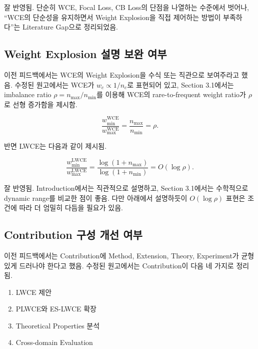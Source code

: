 \documentclass[11pt,a4paper]{article}
\begin{document}
\begin{tcolorbox}[title=반영 평가]
잘 반영됨. 단순히 WCE, Focal Loss, CB Loss의 단점을 나열하는 수준에서 벗어나, ``WCE의 단순성을 유지하면서 Weight Explosion을 직접 제어하는 방법이 부족하다''는 Literature Gap으로 정리되었음.
\end{tcolorbox}

\subsection{Weight Explosion 설명 보완 여부}

이전 피드백에서는 WCE의 Weight Explosion을 수식 또는 직관으로 보여주라고 했음. 수정된 원고에서는 WCE가 \(w_c \propto 1/n_c\)로 표현되어 있고, Section 3.1에서는 imbalance ratio \(\rho=n_{\max}/n_{\min}\)를 이용해 WCE의 rare-to-frequent weight ratio가 \(\rho\)로 선형 증가함을 제시함.

\begin{equation}
\frac{w^{\mathrm{WCE}}_{\min}}{w^{\mathrm{WCE}}_{\max}} = \frac{n_{\max}}{n_{\min}} = \rho.
\end{equation}

반면 LWCE는 다음과 같이 제시됨.

\begin{equation}
\frac{w^{\mathrm{LWCE}}_{\min}}{w^{\mathrm{LWCE}}_{\max}}
=
\frac{\log(1+n_{\max})}{\log(1+n_{\min})}
=O(\log \rho).
\end{equation}

\begin{tcolorbox}[title=반영 평가]
잘 반영됨. Introduction에서는 직관적으로 설명하고, Section 3.1에서는 수학적으로 dynamic range를 비교한 점이 좋음. 다만 아래에서 설명하듯이 \(O(\log \rho)\) 표현은 조건에 따라 더 엄밀히 다듬을 필요가 있음.
\end{tcolorbox}

\subsection{Contribution 구성 개선 여부}

이전 피드백에서는 Contribution에 Method, Extension, Theory, Experiment가 균형 있게 드러나야 한다고 했음. 수정된 원고에서는 Contribution이 다음 네 가지로 정리됨.

\begin{enumerate}
\item LWCE 제안
\item PLWCE와 ES-LWCE 확장
\item Theoretical Properties 분석
\item Cross-domain Evaluation
\end{enumerate}
\end{document}
